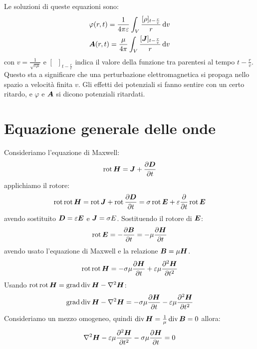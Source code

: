 Le soluzioni di queste equazioni sono:
\begin{gather}
\varphi(r,t)=\frac{1}{4\pi\varepsilon}\int_V\frac{[\rho]_{t-\frac{r}{v}}}{r}\,\mathrm{d} v\\
\boldsymbol{A}(r,t)=\frac{\mu}{4\pi}\int_V\frac{[\boldsymbol{J}]_{t-\frac{r}{v}}}{r}\,\mathrm{d} v\\
\end{gather}
con $v=\frac{1}{\sqrt{\varepsilon\mu}}$ e $[\;\;]_{t-\frac{r}{v}}$ indica il valore della funzione tra parentesi al tempo $t-\frac{r}{v}$. Questo sta a significare che una perturbazione elettromagnetica si propaga nello spazio a velocità finita $v$. Gli effetti dei potenziali si fanno sentire con un certo ritardo, e $\varphi$ e $\boldsymbol{A}$ si dicono potenziali ritardati.
\section{Equazione generale delle onde}
Consideriamo l'equazione di Maxwell:
\begin{equation*}
\operatorname{rot}\boldsymbol{H}=\boldsymbol{J}+\frac{\partial\boldsymbol{D}}{\partial t}
\end{equation*}
applichiamo il rotore:
\begin{equation*}
\operatorname{rot}\operatorname{rot} \boldsymbol{H}=\operatorname{rot} \boldsymbol{J}+\operatorname{rot}\frac{\partial\boldsymbol{D}}{\partial t}=\sigma\operatorname{rot}\boldsymbol{E}+\varepsilon\frac{\partial}{\partial t}\operatorname{rot}\boldsymbol{E}
\end{equation*}
avendo sostituito $\boldsymbol{D}=\varepsilon\boldsymbol{E}$ e $\boldsymbol{J}=\sigma E$. Sostituendo il rotore di $\boldsymbol{E}$:
\begin{equation*}
\operatorname{rot}\boldsymbol{E}=-\frac{\partial\boldsymbol{B}}{\partial t}=-\mu\frac{\partial\boldsymbol{H}}{\partial t}
\end{equation*}
avendo usato l'equazione di Maxwell e la relazione $\boldsymbol{B}=\mu\boldsymbol{H}$.
\begin{equation*}
\operatorname{rot}\operatorname{rot} \boldsymbol{H}=-\sigma\mu\frac{\partial\boldsymbol{H}}{\partial t}+\varepsilon\mu\frac{\partial^2\boldsymbol{H}}{\partial t^2}
\end{equation*}
Usando $\operatorname{rot}\operatorname{rot}\boldsymbol{H}=\operatorname{grad}\operatorname{div}\boldsymbol{H}-\nabla^2\boldsymbol{H}$:
\begin{equation}
\operatorname{grad}\operatorname{div}\boldsymbol{H}-\nabla^2\boldsymbol{H}=-\sigma\mu\frac{\partial\boldsymbol{H}}{\partial t}-\varepsilon\mu\frac{\partial^2\boldsymbol{H}}{\partial t^2}
\end{equation}
Consideriamo un mezzo omogeneo, quindi $\operatorname{div}\boldsymbol{H}=\frac{1}{\mu}\operatorname{div}\boldsymbol{B}=0$ allora:
\begin{equation}
\nabla^2\boldsymbol{H}-\varepsilon\mu\frac{\partial^2\boldsymbol{H}}{\partial t^2}-\sigma\mu\frac{\partial\boldsymbol{H}}{\partial t}=0
\end{equation}

